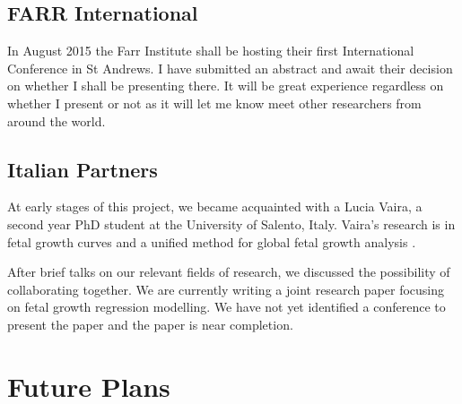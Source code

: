 \documentclass[bsc]{abdnthesis}
\begin{document}
\section{FARR International} %
\label{sec:farr_international}
In August 2015 the Farr Institute shall be hosting their first International Conference in St Andrews\cite{ farr}. I have submitted an abstract and await their decision on whether I shall be presenting there. It will be great experience regardless on whether I present or not as it will let me know meet other researchers from around the world. 
\section{Italian Partners} %
\label{sec:italian_partners}
At early stages of this project, we became acquainted with a Lucia Vaira, a second year PhD student at the University of Salento, Italy. Vaira's research is in fetal growth curves and a unified method for global fetal growth analysis \cite{ luccia1, luccia2, luccia3}. 

After brief talks on our relevant fields of research, we discussed the possibility of collaborating together. We are currently writing a joint research paper focusing on fetal growth regression modelling. We have not yet identified a conference to present the paper and the paper is near completion. 

\chapter{Future Plans}
\end{document}

